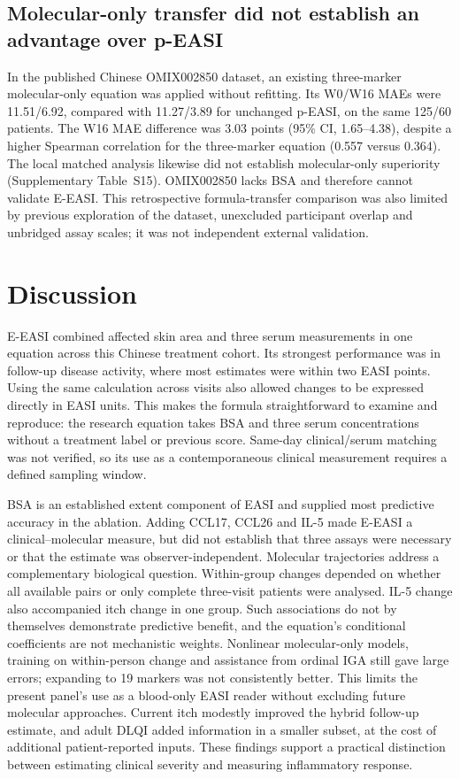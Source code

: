 \documentclass[10pt,a4paper]{article}
\begin{document}
\subsection{Molecular-only transfer did not establish an advantage over p-EASI}
In the published Chinese OMIX002850 dataset, an existing three-marker molecular-only equation was applied without refitting. Its W0/W16 MAEs were 11.51/6.92, compared with 11.27/3.89 for unchanged p-EASI, on the same 125/60 patients. The W16 MAE difference was 3.03 points (95\% CI, 1.65--4.38), despite a higher Spearman correlation for the three-marker equation (0.557 versus 0.364). The local matched analysis likewise did not establish molecular-only superiority (Supplementary Table~S15). OMIX002850 lacks BSA and therefore cannot validate E-EASI. This retrospective formula-transfer comparison was also limited by previous exploration of the dataset, unexcluded participant overlap and unbridged assay scales; it was not independent external validation.

\section{Discussion}
E-EASI combined affected skin area and three serum measurements in one equation across this Chinese treatment cohort. Its strongest performance was in follow-up disease activity, where most estimates were within two EASI points. Using the same calculation across visits also allowed changes to be expressed directly in EASI units. This makes the formula straightforward to examine and reproduce: the research equation takes BSA and three serum concentrations without a treatment label or previous score. Same-day clinical/serum matching was not verified, so its use as a contemporaneous clinical measurement requires a defined sampling window.

BSA is an established extent component of EASI and supplied most predictive accuracy in the ablation.\citep{hanifin2022,home_easi} Adding CCL17, CCL26 and IL-5 made E-EASI a clinical--molecular measure, but did not establish that three assays were necessary or that the estimate was observer-independent. Molecular trajectories address a complementary biological question. Within-group changes depended on whether all available pairs or only complete three-visit patients were analysed. IL-5 change also accompanied itch change in one group. Such associations do not by themselves demonstrate predictive benefit, and the equation's conditional coefficients are not mechanistic weights. Nonlinear molecular-only models, training on within-person change and assistance from ordinal IGA still gave large errors; expanding to 19 markers was not consistently better. This limits the present panel's use as a blood-only EASI reader without excluding future molecular approaches. Current itch modestly improved the hybrid follow-up estimate, and adult DLQI added information in a smaller subset, at the cost of additional patient-reported inputs. These findings support a practical distinction between estimating clinical severity and measuring inflammatory response.
\end{document}

